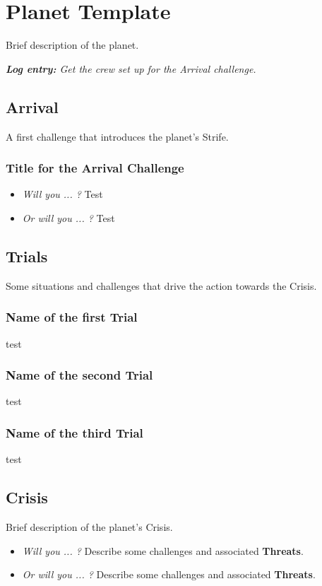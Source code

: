 \documentclass[11pt, a5paper, parskip=half-, DIV=12]{scrartcl}
\begin{document}
\section*{Planet Template}
Brief description of the planet.

\textit{\textbf{Log entry:} Get the crew set up for the Arrival challenge.}

\subsection*{Arrival}
A first challenge that introduces the planet's Strife.

\subsubsection*{Title for the Arrival Challenge}
\begin{itemize}
	\item \textit{Will you ... ?} Test
	\item \textit{Or will you ... ?} Test
\end{itemize}

\newpage

\subsection*{Trials}
Some situations and challenges that drive the action towards the Crisis.

\subsubsection*{Name of the first Trial}
test

\subsubsection*{Name of the second Trial}
test

\subsubsection*{Name of the third Trial}
test

\subsection*{Crisis}
Brief description of the planet's Crisis.
\begin{itemize}
	\item \textit{Will you ... ?} Describe some challenges and associated \textbf{Threats}.
	\item \textit{Or will you ... ?} Describe some challenges and associated \textbf{Threats}.
\end{itemize}
\end{document}
